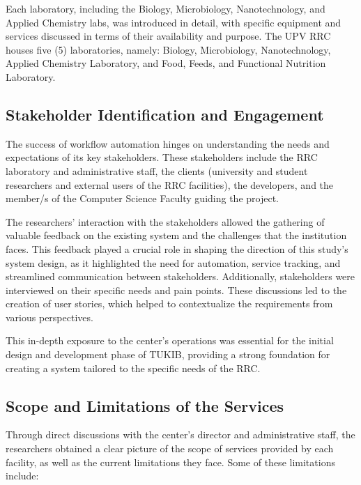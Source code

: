 Each laboratory, including the Biology, Microbiology, Nanotechnology, and Applied Chemistry labs, was introduced in detail, with specific equipment and services discussed in terms of their availability and purpose. The UPV RRC houses five (5) laboratories, namely: Biology, Microbiology, Nanotechnology, Applied Chemistry Laboratory, and Food, Feeds, and Functional Nutrition Laboratory.

\subsection{Stakeholder Identification and Engagement}
The success of workflow automation hinges on understanding the needs and expectations of its key stakeholders. These stakeholders include the RRC laboratory and administrative staff, the clients (university and student researchers and external users of the RRC facilities), the developers, and the member/s of the Computer Science Faculty guiding the project.

The researchers' interaction with the stakeholders allowed the gathering of valuable feedback on the existing system and the challenges that the institution faces. This feedback played a crucial role in shaping the direction of this study's system design, as it highlighted the need for automation, service tracking, and streamlined communication between stakeholders. Additionally, stakeholders were interviewed on their specific needs and pain points. These discussions led to the creation of user stories, which helped to contextualize the requirements from various perspectives. 

This in-depth exposure to the center’s operations was essential for the initial design and development phase of TUKIB, providing a strong foundation for creating a system tailored to the specific needs of the RRC.

\subsection{Scope and Limitations of the Services}
Through direct discussions with the center’s director and administrative staff, the researchers obtained a clear picture of the scope of services provided by each facility, as well as the current limitations they face. Some of these limitations include:

